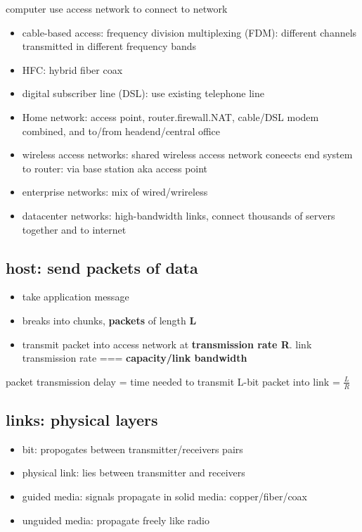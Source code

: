 \documentclass[10pt]{article}
\theoremstyle{break}
\begin{document}
computer use access network to connect to network  
\begin{itemize}
    \item cable-based access: frequency division multiplexing (FDM): different channels transmitted in different frequency bands
    \item HFC: hybrid fiber coax
    \item digital subscriber line (DSL): use existing telephone line
    \item Home network: access point, router.firewall.NAT, cable/DSL modem combined, and to/from headend/central office
    \item wireless access networks: shared wireless access network coneects end system to router: via base station aka access point
    \item enterprise networks: mix of wired/wrireless 
    \item datacenter networks: high-bandwidth links, connect thousands of servers together and to internet
\end{itemize}

\subsection{host: send packets of data}
\begin{itemize}
    \item take application message 
    \item breaks into chunks, \textbf{packets} of length \textbf{L}
    \item transmit packet into access network at \textbf{transmission rate R}. link transmission rate === \textbf{capacity/link bandwidth}
\end{itemize}

packet transmission delay = time needed to transmit L-bit packet into link = $\frac{L}{R}$
\subsection{links: physical layers}
\begin{itemize}
    \item bit: propogates between transmitter/receivers pairs 
    \item physical link: lies between transmitter and receivers
    \item guided media: signals propagate in solid media: copper/fiber/coax 
    \item unguided media: propagate freely like radio
\end{itemize}
\end{document}

